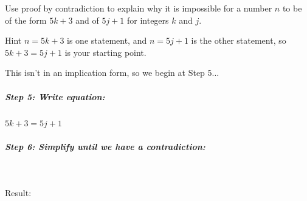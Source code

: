 \documentclass[a4paper,12pt]{book}
\newcounter{question}
\begin{document}
        \newpage

        \begin{questionNOGRADE}{\thequestion}

            Use proof by contradiction to explain why it is impossible
            for a number $n$ to be of the form $5k+3$ and of $5j+1$ for
            integers $k$ and $j$.

            \begin{hint}{Hint}
                $n = 5k+3$ is one statement, and $n = 5j+1$ is the other statement,
                so $5k+3 = 5j+1$ is your starting point.
            \end{hint}

            This isn't in an implication form, so we begin at Step 5...
                
            \subparagraph{Step 5: Write equation:} $5k+3 = 5j+1$

            \subparagraph{Step 6: Simplify until we have a contradiction:} ~\\

            Result:
            
        \end{questionNOGRADE}
\end{document}
